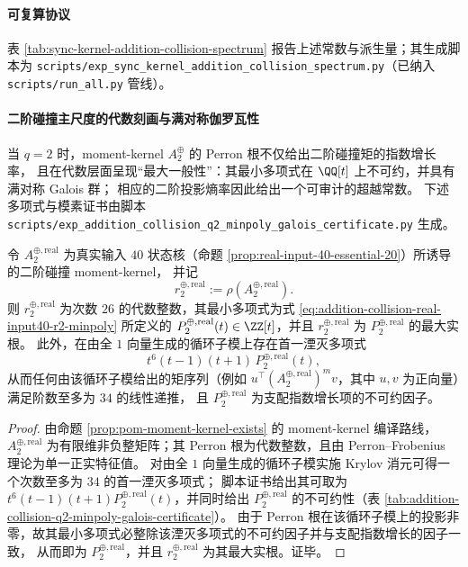 \paragraph{可复算协议}
表 \ref{tab:sync-kernel-addition-collision-spectrum} 报告上述常数与派生量；其生成脚本为
\texttt{scripts/exp\_sync\_kernel\_addition\_collision\_spectrum.py}（已纳入 \texttt{scripts/run\_all.py} 管线）。


\paragraph{二阶碰撞主尺度的代数刻画与满对称伽罗瓦性}
当 \(q=2\) 时，moment-kernel \(A^{\oplus}_2\) 的 Perron 根不仅给出二阶碰撞矩的指数增长率，
且在代数层面呈现“最大一般性”：其最小多项式在 \(\QQ[t]\) 上不可约，并具有满对称 Galois 群；
相应的二阶投影熵率因此给出一个可审计的超越常数。
下述多项式与模素证书由脚本 \texttt{scripts/exp\_addition\_collision\_q2\_minpoly\_galois\_certificate.py} 生成。






\begin{theorem}\label{thm:addition-collision-real-input40-q2-minpoly}
令 \(A^{\oplus,\mathrm{real}}_2\) 为真实输入 \(40\) 状态核（命题 \ref{prop:real-input-40-essential-20}）所诱导的二阶碰撞 moment-kernel，
并记
\[
r^{\oplus,\mathrm{real}}_2:=\rho\!\left(A^{\oplus,\mathrm{real}}_2\right).
\]
则 \(r^{\oplus,\mathrm{real}}_2\) 为次数 \(26\) 的代数整数，其最小多项式为式 \ref{eq:addition-collision-real-input40-r2-minpoly} 所定义的
\(P^{\oplus,\mathrm{real}}_2(t)\in\ZZ[t]\)，并且 \(r^{\oplus,\mathrm{real}}_2\) 为 \(P^{\oplus,\mathrm{real}}_2\) 的最大实根。
此外，在由全 \(1\) 向量生成的循环子模上存在首一湮灭多项式
\[
t^{6}(t-1)(t+1)\,P^{\oplus,\mathrm{real}}_2(t),
\]
从而任何由该循环子模给出的矩序列（例如 \(u^{\top}(A^{\oplus,\mathrm{real}}_2)^{m}v\)，其中 \(u,v\) 为正向量）满足阶数至多为 \(34\) 的线性递推，
且 \(P^{\oplus,\mathrm{real}}_2\) 为支配指数增长项的不可约因子。
\end{theorem}

\begin{proof}
由命题 \ref{prop:pom-moment-kernel-exists} 的 moment-kernel 编译路线，
\(A^{\oplus,\mathrm{real}}_2\) 为有限维非负整矩阵；其 Perron 根为代数整数，且由 Perron--Frobenius 理论为单一正实特征值。
对由全 \(1\) 向量生成的循环子模实施 Krylov 消元可得一个次数至多为 \(34\) 的首一湮灭多项式；
脚本证书给出其可取为 \(t^{6}(t-1)(t+1)P^{\oplus,\mathrm{real}}_2(t)\)，并同时给出 \(P^{\oplus,\mathrm{real}}_2\) 的不可约性（表 \ref{tab:addition-collision-q2-minpoly-galois-certificate}）。
由于 Perron 根在该循环子模上的投影非零，故其最小多项式必整除该湮灭多项式的不可约因子并与支配指数增长的因子一致，
从而即为 \(P^{\oplus,\mathrm{real}}_2\)，并且 \(r^{\oplus,\mathrm{real}}_2\) 为其最大实根。证毕。
\end{proof}

